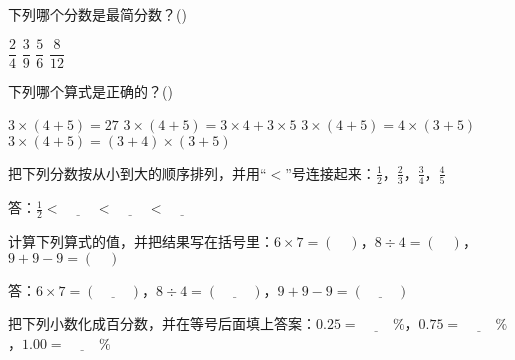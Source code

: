 \documentclass{ksexam}
\begin{document}
\chead{}
\lfoot{}
\cfoot{\thepage{}\ /\ \numpages{}}
\rfoot{}

\begin{center}
    \cellwidth{2.2em}
    \gradetable[h][questions]
\end{center}

\begin{questions}

    \question[10] 下列哪个分数是最简分数？(\hspace*{2em})

    \begin{oneparchoices}
        \choice $\dfrac{2}{4}$
        \choice $\dfrac{3}{9}$
        \CorrectChoice $\dfrac{5}{6}$
        \choice $\dfrac{8}{12}$
    \end{oneparchoices}

    \question[10] 下列哪个算式是正确的？(\hspace*{2em})

    \begin{choices}
        \choice $3 \times (4 + 5) = 27$
        \CorrectChoice $3 \times (4 + 5) = 3 \times 4 + 3 \times 5$
        \choice $3 \times (4 + 5) = 4 \times (3 + 5)$
        \choice $3 \times (4 + 5) = (3 + 4) \times (3 + 5)$
    \end{choices}

    \question[8] 把下列分数按从小到大的顺序排列，并用“$<$”号连接起来：$\frac{1}{2}$，$\frac{2}{3}$，$\frac{3}{4}$，$\frac{4}{5}$

    答：$\frac{1}{2} < \underline{\hspace{1cm}} < \underline{\hspace{1cm}} < \underline{\hspace{1cm}}$

    \question[8] 计算下列算式的值，并把结果写在括号里：$6 \times 7 = (\quad)$，$8 \div 4 = (\quad)$，$9 + 9 - 9 = (\quad)$

    答：$6 \times 7 = (\underline{\hspace{1cm}})$，$8 \div 4 = (\underline{\hspace{1cm}})$，$9 + 9 - 9 = (\underline{\hspace{1cm}})$

    \question[8] 把下列小数化成百分数，并在等号后面填上答案：$0.25 = \underline{\hspace{1cm}} \%$，$0.75 = \underline{\hspace{1cm}} \%$，$1.00 = \underline{\hspace{1cm}} \%$


\end{questions}
\end{document}
